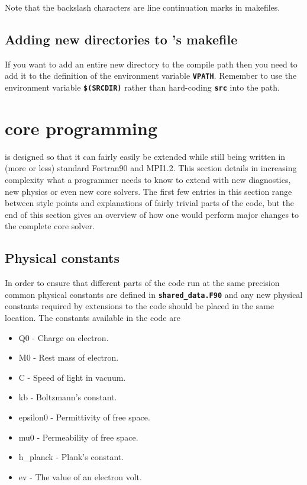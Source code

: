 \documentclass[12pt,a4paper]{article}
\newcommand{\inlinecode}[1]{{\color{warwickred} \bf\texttt{#1}}}
\newcommand{\EPOCH}{{\color{warwickdark}\fontfamily{phv}\selectfont{EPOCH}}}
\begin{document}
Note that the backslash characters are line continuation marks in makefiles.

\subsection{Adding new directories to {\EPOCH}'s makefile}
If you want to add an entire new directory to the {\EPOCH} compile path then
you need to add it to the definition of the environment variable
\inlinecode{VPATH}. Remember to use the environment variable
\inlinecode{\$(SRCDIR)} rather than hard-coding \inlinecode{src} into the path.

\section{{\EPOCH} core programming}
{\EPOCH} is designed so that it can fairly easily be extended while still being
written in (more or less) standard Fortran90 and MPI1.2. This section details
in increasing complexity what a programmer needs to know to extend {\EPOCH} with
new diagnostics, new physics or even new core solvers. The first few entries
in this section range between style points and explanations of fairly trivial
parts of the {\EPOCH} code, but the end of this section gives an overview of how
one would perform major changes to the complete {\EPOCH} core solver.

\subsection{Physical constants}
In order to ensure that different parts of the code run at the same precision
common physical constants are defined in \inlinecode{shared\_data.F90} and any
new physical constants required by extensions to the code should be placed in
the same location. The constants available in the code are
\begin{itemize}
\item Q0 - Charge on electron.
\item M0 - Rest mass of electron.
\item C - Speed of light in vacuum.
\item kb - Boltzmann's constant.
\item epsilon0 - Permittivity of free space.
\item mu0 - Permeability of free space.
\item h\_planck - Plank's constant.
\item ev - The value of an electron volt.
\end{itemize}
\end{document}
